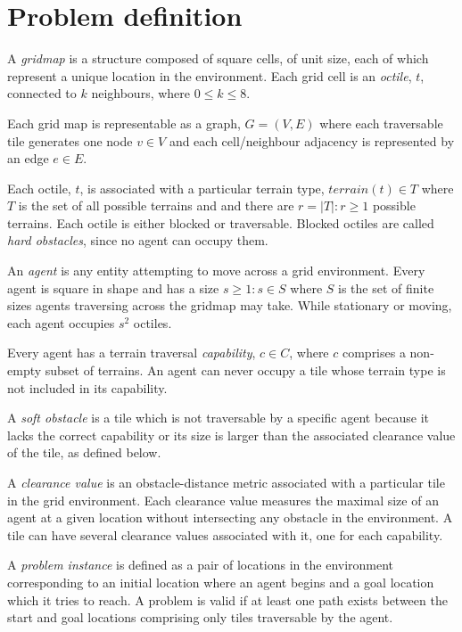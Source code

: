 \section{Problem definition}
A \emph{gridmap} is a structure composed of square cells, of unit size, each of which represent a unique location in the environment. 
Each grid cell is an \emph{octile}, $t$, connected to $k$ neighbours, where  $0 \leq k \leq 8$. 
\par \indent
Each grid map is representable as a graph, $G = (V, E)$ where each traversable tile generates one node $v \in V$ and each cell/neighbour adjacency is represented by an edge $e \in E$.
\par \indent
Each octile, $t$, is associated with a particular terrain type, $terrain(t) \in T$ where $T$ is the set of all possible terrains and and there are $r = |T| : r \geq 1$ possible terrains.
Each octile is either blocked or traversable. 
Blocked octiles are called \emph{hard obstacles}, since no agent can occupy them.
\par \indent
An \emph{agent} is any entity attempting to move across a grid environment. 
Every agent is square in shape and has a size $s \geq 1 : s \in S$ where $S$ is the set of finite sizes agents traversing across the gridmap may take.
While stationary or moving, each agent occupies $s^2$ octiles. 
\par \indent
Every agent has a terrain traversal \emph{capability}, $c \in C$, where $c$ comprises a non-empty subset of terrains.
An agent can never occupy a tile whose terrain type is not included in its capability.
\par \indent 
A \emph{soft obstacle} is a tile which is not traversable by a specific agent because it lacks the correct capability or its size is larger than the associated clearance value of the tile, as defined below. 
\par \indent
A \emph{clearance value} is an obstacle-distance metric associated with a particular tile in the grid environment. 
Each clearance value measures the maximal size of an agent at a given location without intersecting any obstacle in the environment. 
A tile can have several clearance values associated with it, one for each capability. 
\par \indent
A \emph{problem instance} is defined as a pair of locations in the environment corresponding to an initial location where an agent begins and a goal location which it tries to reach. A problem is valid if at least one path exists between the start and goal locations comprising only tiles traversable by the agent. 
